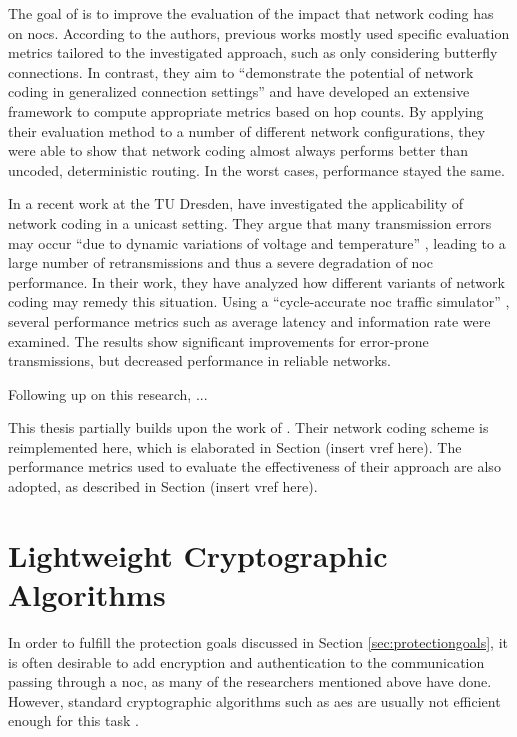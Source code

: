 The goal of \citeauthor{vonbun13nchopcount} \cite{vonbun13nchopcount} is to improve the evaluation of the impact that network coding has on
\glspl{noc}. According to the authors, previous works mostly used specific evaluation metrics tailored to the investigated approach, such as only
considering butterfly connections. In contrast, they aim to \enquote{demonstrate the potential of network coding in generalized connection settings}
\cite[2]{vonbun13nchopcount} and have developed an extensive framework to compute appropriate metrics based on hop counts. By applying their
evaluation method to a number of different network configurations, they were able to show that network coding almost always performs better than uncoded,
deterministic routing. In the worst cases, performance stayed the same.

In a recent work at the TU Dresden, \citeauthor{moriam15manycorenc} \cite{moriam15manycorenc} have investigated the applicability of network coding in
a unicast setting. They argue that many transmission errors may occur \enquote{due to dynamic variations of voltage and temperature}
\cite[1]{moriam15manycorenc}, leading to a large number of retransmissions and thus a severe degradation of \gls{noc} performance. In their work, they
have analyzed how different variants of network coding may remedy this situation. Using a \enquote{cycle-accurate \gls{noc} traffic simulator}
\cite[3]{moriam15manycorenc}, several performance metrics such as average latency and information rate were examined. The results show significant
improvements for error-prone transmissions, but decreased performance in reliable networks.

Following up on this research, ... %

This thesis partially builds upon the work of \citeauthor{moriam15manycorenc}. Their network coding scheme is reimplemented here, which is
elaborated in Section (insert vref here). The performance metrics used to evaluate the effectiveness of their approach are also adopted, as described
in Section (insert vref here).

\section{Lightweight Cryptographic Algorithms}\label{sec:lightweightcrypto}
In order to fulfill the protection goals discussed in Section \ref{sec:protectiongoals}, it is often desirable to add encryption and authentication to
the communication passing through a \gls{noc}, as many of the researchers mentioned above have done. However,
standard cryptographic algorithms such as \gls{aes} are usually not efficient enough for this task \cite[1]{bogdanov07present}.

